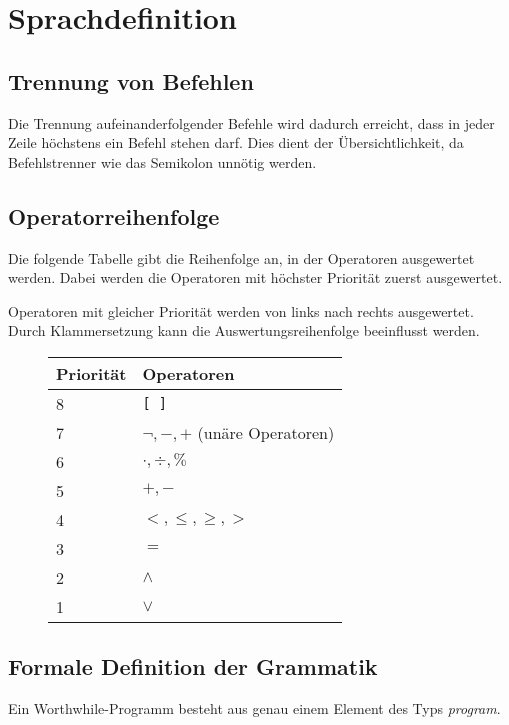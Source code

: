 \section{Sprachdefinition}

\subsection{Trennung von Befehlen}

Die Trennung aufeinanderfolgender Befehle wird dadurch erreicht, dass in jeder Zeile höchstens ein Befehl stehen darf. Dies dient der Übersichtlichkeit, da Befehlstrenner wie das Semikolon unnötig werden.

\subsection{Operatorreihenfolge}

Die folgende Tabelle gibt die Reihenfolge an, in der Operatoren ausgewertet werden. Dabei werden die Operatoren mit höchster Priorität zuerst ausgewertet.

Operatoren mit gleicher Priorität werden von links nach rechts ausgewertet. Durch Klammersetzung kann die Auswertungsreihenfolge beeinflusst werden.

\begin{figure}[H]
\begin{tabular}{|l|l|}
\hline
\textbf{Priorität} & \textbf{Operatoren} \\
\hline
8 & \texttt{{[}\,{]}} \\
\hline
7 & $\neg, -, +$ (unäre Operatoren)\\
\hline
6 & $\cdot, \div, \%$\\
\hline
5 & $+, -$\\
\hline
4 & $<, \leq, \geq, >$\\
\hline
3 & $=$\\
\hline
2 & $\wedge$ \\
\hline
1 & $\vee$ \\
\hline
\end{tabular}
\end{figure}

\subsection{Formale Definition der Grammatik}

Ein Worthwhile-Programm besteht aus genau einem Element des Typs \textit{program}.

